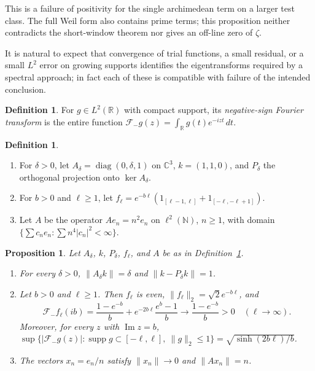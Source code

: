 \documentclass[11pt]{amsart}
\theoremstyle{plain}
\newtheorem{proposition}[theorem]{Proposition}
\theoremstyle{definition}
\newtheorem{definition}[theorem]{Definition}
\theoremstyle{remark}
\numberwithin{equation}{section}
\newcommand{\C}{\mathbb{C}}
\newcommand{\R}{\mathbb{R}}
\newcommand{\N}{\mathbb{N}}
\DeclareMathOperator{\Ima}{Im}
\DeclareMathOperator{\diag}{diag}
\renewcommand{\Im}{\Ima}
\begin{document}
This is a failure of positivity for the single archimedean term on a
larger test class. The full Weil form also contains prime terms; this
proposition neither contradicts the short-window theorem nor gives an
off-line zero of $\zeta$.

It is natural to expect that convergence of trial functions, a small
residual, or a small $L^2$ error on growing supports identifies the
eigentransforms required by a spectral approach; in fact each of these
is compatible with failure of the intended conclusion.

\begin{definition}\label{def:Fminus}
For $g\in L^2(\R)$ with compact support, its \emph{negative-sign Fourier
transform} is the entire function
$\mathcal F_-g(z)=\int_\R g(t)e^{-izt}\,dt$.
\end{definition}

\begin{definition}\label{def:R16-examples}
\begin{enumerate}[label=(\alph*)]
\item For $\delta>0$, let $A_\delta=\diag(0,\delta,1)$ on $\C^3$,
  $k=(1,1,0)$, and $P_\delta$ the orthogonal projection onto
  $\ker A_\delta$.
\item For $b>0$ and $\ell\ge1$, let
  $f_\ell=e^{-b\ell}(1_{[\ell-1,\ell]}+1_{[-\ell,-\ell+1]})$.
\item Let $A$ be the operator $Ae_n=n^2e_n$ on $\ell^2(\N)$, $n\ge1$,
  with domain $\{\sum c_ne_n:\sum n^4|c_n|^2<\infty\}$.
\end{enumerate}
\end{definition}

\begin{proposition}\label{prop:R16}
Let $A_\delta$, $k$, $P_\delta$, $f_\ell$, and $A$ be as in
Definition~\ref{def:R16-examples}.
\begin{enumerate}[label=(\roman*)]
\item\label{item:R16-gap} For every $\delta>0$,
  $\|A_\delta k\|=\delta$ and $\|k-P_\delta k\|=1$.
\item\label{item:R16-strip} Let $b>0$ and $\ell\ge1$. Then
  $f_\ell$ is even, $\|f_\ell\|_2=\sqrt2e^{-b\ell}$, and
  \[
  \mathcal F_-f_\ell(ib)=\frac{1-e^{-b}}b+e^{-2b\ell}\frac{e^b-1}b
  \longrightarrow\frac{1-e^{-b}}b>0\quad(\ell\to\infty).
  \]
  Moreover, for every $z$ with $\Im z=b$,
  $\sup\{|\mathcal F_-g(z)|:\operatorname{supp}g\subset[-\ell,\ell],
  \ \|g\|_2\le1\}=\sqrt{\sinh(2b\ell)/b}$.
\item\label{item:R16-unbounded} The vectors $x_n=e_n/n$ satisfy
  $\|x_n\|\to0$ and $\|Ax_n\|=n$.
\end{enumerate}
\end{proposition}
\end{document}
